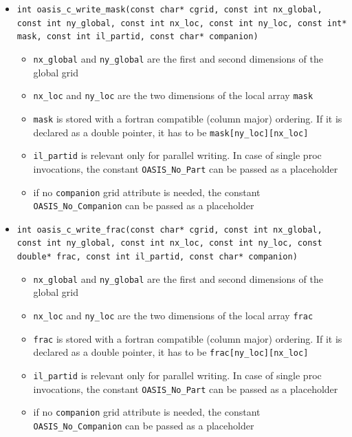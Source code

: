 \begin{itemize}
\vspace{0.2cm}
\item {\tt int oasis\_c\_write\_mask(const char* cgrid, const int nx\_global, const int ny\_global, const int nx\_loc, const int ny\_loc, const int* mask, const int il\_partid, const char* companion)}
  \begin{itemize}
    \item {\tt nx\_global} and {\tt ny\_global} are the first and second dimensions
      of the global grid
    \item {\tt nx\_loc} and {\tt ny\_loc} are the two dimensions
      of the local array {\tt mask}
    \item {\tt mask} is stored with a fortran compatible
      (column major) ordering. If it is  declared as a double
      pointer, it has to be {\tt mask[ny\_loc][nx\_loc]}
    \item {\tt il\_partid} is relevant only for parallel writing. In case
      of single proc invocations, the constant {\tt OASIS\_No\_Part}
      can be passed as a placeholder
    \item if no {\tt companion} grid attribute is needed, the constant
      {\tt OASIS\_No\_Companion} can be passed as a placeholder
  \end{itemize}

\vspace{0.2cm}
\item {\tt int oasis\_c\_write\_frac(const char* cgrid, const int nx\_global, const int ny\_global, const int nx\_loc, const int ny\_loc, const double* frac, const int il\_partid, const char* companion)}
  \begin{itemize}
    \item {\tt nx\_global} and {\tt ny\_global} are the first and second dimensions
      of the global grid
    \item {\tt nx\_loc} and {\tt ny\_loc} are the two dimensions
      of the local array {\tt frac}
    \item {\tt frac} is stored with a fortran compatible
      (column major) ordering. If it is  declared as a double
      pointer, it has to be {\tt frac[ny\_loc][nx\_loc]}
    \item {\tt il\_partid} is relevant only for parallel writing. In case
      of single proc invocations, the constant {\tt OASIS\_No\_Part}
      can be passed as a placeholder
    \item if no {\tt companion} grid attribute is needed, the constant
      {\tt OASIS\_No\_Companion} can be passed as a placeholder
  \end{itemize}


\end{itemize}
